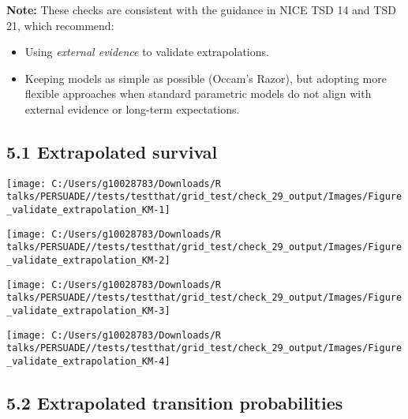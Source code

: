 \documentclass[
]{article}
\providecommand{\tightlist}{%
  \setlength{\itemsep}{0pt}\setlength{\parskip}{0pt}}
\begin{document}
\textbf{Note:} These checks are consistent with the guidance in NICE TSD
14 and TSD 21, which recommend:

\begin{itemize}
\tightlist
\item
  Using \emph{external evidence} to validate extrapolations.\\
\item
  Keeping models as simple as possible (Occam's Razor), but adopting
  more flexible approaches when standard parametric models do not align
  with external evidence or long-term expectations.
\end{itemize}

\subsection{5.1 Extrapolated survival}\label{extrapolated-survival}

\begin{flushleft}\texttt{[image: C:/Users/g10028783/Downloads/R talks/PERSUADE//tests/testthat/grid\_test/check\_29\_output/Images/Figure\_validate\_extrapolation\_KM-1]} \end{flushleft}

\begin{flushleft}\texttt{[image: C:/Users/g10028783/Downloads/R talks/PERSUADE//tests/testthat/grid\_test/check\_29\_output/Images/Figure\_validate\_extrapolation\_KM-2]} \end{flushleft}

\begin{flushleft}\texttt{[image: C:/Users/g10028783/Downloads/R talks/PERSUADE//tests/testthat/grid\_test/check\_29\_output/Images/Figure\_validate\_extrapolation\_KM-3]} \end{flushleft}

\begin{flushleft}\texttt{[image: C:/Users/g10028783/Downloads/R talks/PERSUADE//tests/testthat/grid\_test/check\_29\_output/Images/Figure\_validate\_extrapolation\_KM-4]} \end{flushleft}

\clearpage

\subsection{5.2 Extrapolated transition
probabilities}\label{extrapolated-transition-probabilities}
\end{document}
